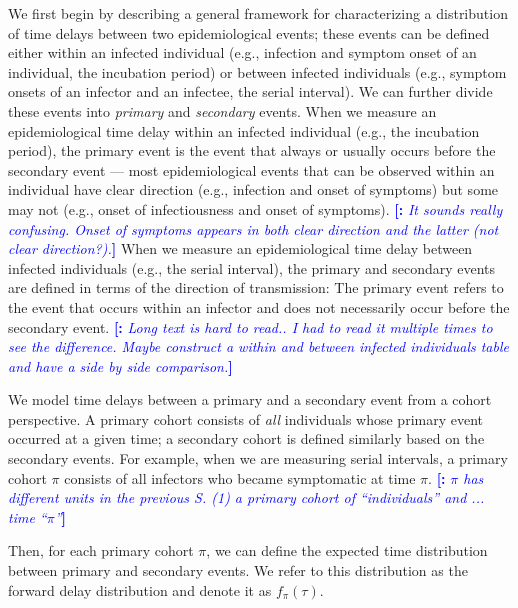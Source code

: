 \documentclass[12pt]{article}
\newcommand{\comment}{\showcomment}
\newcommand{\showcomment}[3]{\textcolor{#1}{\textbf{[#2: }\textsl{#3}\textbf{]}}}
\newcommand{\jd}[1]{\comment{cyan}{JD}{#1}}
\newcommand{\mli}[1]{\comment{blue}{}{#1}}
\begin{document}
We first begin by describing a general framework for characterizing a distribution of time delays between two epidemiological events;
these events can be defined either within an infected individual (e.g., infection and symptom onset of an individual, the incubation period) or between infected individuals (e.g., symptom onsets of an infector and an infectee, the serial interval).
We can further divide these events into \emph{primary} and \emph{secondary} events.
When we measure an epidemiological time delay within an infected individual (e.g., the incubation period), the primary event is the event that always or usually occurs before the secondary event ---
most epidemiological events that can be observed within an individual have clear direction (e.g., infection and onset of symptoms) but some may not (e.g., onset of infectiousness and onset of symptoms).
\mli{It sounds really confusing. Onset of symptoms appears in both clear direction and the latter (not clear direction?).}
When we measure an epidemiological time delay between infected individuals (e.g., the serial interval), 
the primary and secondary events are defined in terms of the direction of transmission:
The primary event refers to the event that occurs within an infector and does not necessarily occur before the secondary event.
\mli{Long text is hard to read.. I had to read it multiple times to see the difference. Maybe construct a within and between infected individuals table and have a side by side comparison.}

We model time delays between a primary and a secondary event from a cohort perspective.
A primary cohort consists of \emph{all} individuals whose primary event occurred at a given time; 
a secondary cohort is defined similarly based on the secondary events.
For example, when we are measuring serial intervals, a primary cohort $\pi$ consists of all infectors who became symptomatic at time $\pi$.
\mli{$\pi$ has different units in the previous S. (1) a primary cohort of ``individuals'' and ... time ``$\pi$''}

Then, for each primary cohort $\pi$, we can define the expected time distribution between primary and secondary events.
We refer to this distribution as the forward delay distribution and denote it as $f_\pi(\tau)$.
\end{document}
